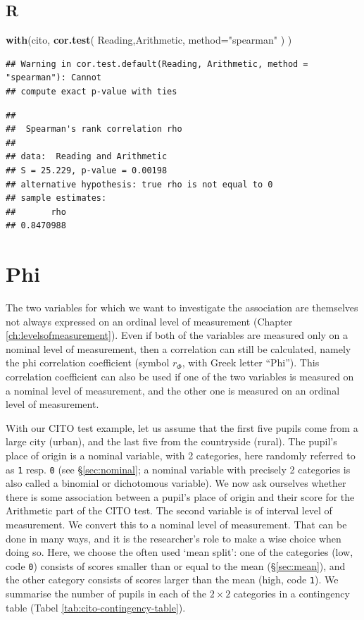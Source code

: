\documentclass[
]{book}
\newenvironment{Shaded}{\begin{snugshade}}{\end{snugshade}}
\newcommand{\DataTypeTok}[1]{\textcolor[rgb]{0.13,0.29,0.53}{#1}}
\newcommand{\KeywordTok}[1]{\textcolor[rgb]{0.13,0.29,0.53}{\textbf{#1}}}
\newcommand{\NormalTok}[1]{#1}
\newcommand{\StringTok}[1]{\textcolor[rgb]{0.31,0.60,0.02}{#1}}
\begin{document}
\hypertarget{r-8}{%
\subsection{R}\label{r-8}}

\begin{Shaded}
\begin{Highlighting}[]
\KeywordTok{with}\NormalTok{(cito, }\KeywordTok{cor.test}\NormalTok{( Reading,Arithmetic, }\DataTypeTok{method=}\StringTok{"spearman"}\NormalTok{ ) )}
\end{Highlighting}
\end{Shaded}

\begin{verbatim}
## Warning in cor.test.default(Reading, Arithmetic, method = "spearman"): Cannot
## compute exact p-value with ties
\end{verbatim}

\begin{verbatim}
## 
##  Spearman's rank correlation rho
## 
## data:  Reading and Arithmetic
## S = 25.229, p-value = 0.00198
## alternative hypothesis: true rho is not equal to 0
## sample estimates:
##       rho 
## 0.8470988
\end{verbatim}

\hypertarget{sec:Phi}{%
\section{Phi}\label{sec:Phi}}

The two variables for which we want to investigate the association are themselves
not always expressed on an ordinal level of measurement (Chapter \ref{ch:levelsofmeasurement}).
Even if both of the variables are measured only on a nominal level of measurement,
then a correlation can still be calculated, namely the phi correlation coefficient
(symbol \(r_\Phi\), with Greek letter ``Phi''). This correlation coefficient can also be used
if one of the two variables is measured on a nominal level of measurement,
and the other one is measured on an ordinal level of measurement.

With our CITO test example, let us assume that the first five
pupils come from a large city (urban), and the last five from the
countryside (rural). The pupil's place of origin is a nominal variable,
with 2 categories, here randomly referred to as \texttt{1} resp. \texttt{0} (see
§\ref{sec:nominal}; a nominal variable with precisely 2
categories is also called a binomial or dichotomous variable).
We now ask ourselves whether there is some association between a
pupil's place of origin and their score for the Arithmetic part of the CITO test.
The second variable is of interval level of measurement. We convert this to a
nominal level of measurement. That can be done in many ways, and it is the
researcher's role to make a wise choice when doing so. Here, we
choose the often used `mean split': one of the categories (low, code \texttt{0})
consists of scores smaller than or equal to the mean
(§\ref{sec:mean}), and the other category consists of scores larger
than the mean (high, code \texttt{1}). We summarise the number of pupils in each of the
\(2\times 2\) categories in a contingency table
(Tabel \ref{tab:cito-contingency-table}).
\end{document}
